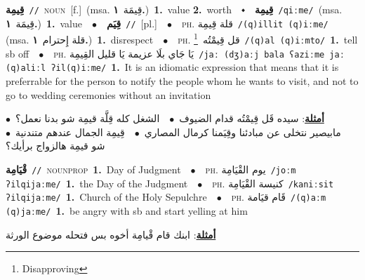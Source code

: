 \documentclass[10pt,a4paper,twoside]{article} %
\begin{document}
\begin{multicols}{2}
{\setlength\topsep{0pt}\textbf{\foreignlanguage{arabic}{قِيمِة}}\ {\color{gray}\texttt{//}\color{black}}\ \textsc{noun}\ [f.]\ \color{gray}(msa. \foreignlanguage{arabic}{قِيمَة}~\foreignlanguage{arabic}{\textbf{١.}})\color{black}\ \textbf{1.}~value  \textbf{2.}~worth\ \ $\smblkdiamond$\ \ \setlength\topsep{0pt}\textbf{\foreignlanguage{arabic}{قِيمِة}}\ {\color{gray}\texttt{/qiːme/}\color{black}}\ \color{gray}(msa. \foreignlanguage{arabic}{قِيمَة}~\foreignlanguage{arabic}{\textbf{١.}})\color{black}\ \textbf{1.}~value\ \ $\bullet$\ \ \setlength\topsep{0pt}\textbf{\foreignlanguage{arabic}{قِيَم}}\ {\color{gray}\texttt{//}\color{black}}\ [pl.]\ \ $\bullet$\ \ \textsc{ph.} \color{gray} \foreignlanguage{arabic}{قلة قِيمِة}\color{black}\ {\color{gray}\texttt{/{\sffamily (q)illit (q)iːme}/}\color{black}}\ \color{gray} (msa. \foreignlanguage{arabic}{قلة إِحترام}~\foreignlanguage{arabic}{\textbf{١.}})\color{black}\ \textbf{1.}~disrespect\ \ $\bullet$\ \ \textsc{ph.} \color{gray} \foreignlanguage{arabic}{قل قِيمْتُه}\color{black}\ \footnote{Disapproving}\ {\color{gray}\texttt{/{\sffamily (q)al (q)iːmto}/}\color{black}}\ \textbf{1.}~tell sb off\ \ $\bullet$\ \ \textsc{ph.} \color{gray} \foreignlanguage{arabic}{يَا جَاي بلَا عزيمة يَا قليل القِيمِة}\color{black}\ {\color{gray}\texttt{/{\sffamily jaː (dʒ)aːj bala ʕaziːme jaː (q)aliːl ʔil(q)iːme}/}\color{black}}\ \textbf{1.}~It is an idiomatic expression that means that it is preferrable for the person to notify the people whom he wants to visit, and not to go to wedding ceremonies without an invitation\  \begin{flushright}\color{gray}\foreignlanguage{arabic}{\textbf{\underline{\foreignlanguage{arabic}{أمثلة}}}: سيده قَل قِيمْتُه قدام الضيوف\ $\bullet$\ \  الشغل كله قِلَّة قيمِة شو بدنا نعمل؟\ $\bullet$\ \  مابيصير نتخلى عن مبادئنا وقِيَمنا كرمال المصاري\ $\bullet$\ \  قِيمِة الجمال عندهم متندنية\ $\bullet$\ \  شو قيمِة هالزواج برأيك؟}\end{flushright}\color{black}} \vspace{2mm}

{\setlength\topsep{0pt}\textbf{\foreignlanguage{arabic}{قْيَامِة}}\ {\color{gray}\texttt{//}\color{black}}\ \textsc{noun\textunderscore prop}\ \textbf{1.}~Day of Judgment\ \ $\bullet$\ \ \textsc{ph.} \color{gray} \foreignlanguage{arabic}{يوم القْيَامِة}\color{black}\ {\color{gray}\texttt{/{\sffamily joːm ʔilqijaːme}/}\color{black}}\ \textbf{1.}~the Day of the Judgment\ \ $\bullet$\ \ \textsc{ph.} \color{gray} \foreignlanguage{arabic}{كنيسة القْيَامِة}\color{black}\ {\color{gray}\texttt{/{\sffamily kaniːsit ʔilqijaːme}/}\color{black}}\ \textbf{1.}~Church of the Holy Sepulchre\ \ $\bullet$\ \ \textsc{ph.} \color{gray} \foreignlanguage{arabic}{قَام قيَامة}\color{black}\ {\color{gray}\texttt{/{\sffamily (q)aːm (q)jaːme}/}\color{black}}\ \textbf{1.}~be angry with sb and start yelling at him\  \begin{flushright}\color{gray}\foreignlanguage{arabic}{\textbf{\underline{\foreignlanguage{arabic}{أمثلة}}}: ابنك قام قْيامِة أخوه بس فتحله موضوع الورثة}\end{flushright}\color{black}} \vspace{2mm}


\end{multicols}
\end{document}
